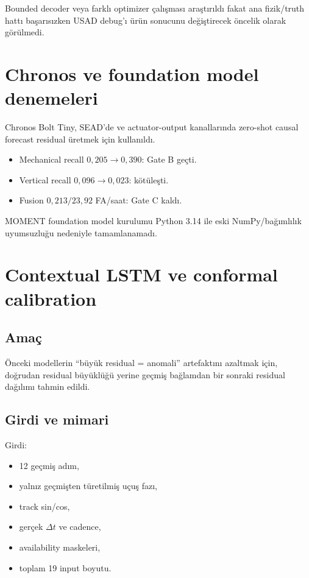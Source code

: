 \documentclass[11pt,a4paper,oneside]{report}
\newcommand{\code}[1]{\texttt{\detokenize{#1}}}
\begin{document}
Bounded decoder veya farklı optimizer çalışması araştırıldı fakat ana
fizik/truth hattı başarısızken USAD debug'ı ürün sonucunu değiştirecek öncelik
olarak görülmedi.

\section{Chronos ve foundation model denemeleri}

Chronos Bolt Tiny, SEAD'de \code{alt} ve actuator-output kanallarında
zero-shot causal forecast residual üretmek için kullanıldı.

\begin{itemize}
  \item Mechanical recall \(0{,}205\to0{,}390\): Gate B geçti.
  \item Vertical recall \(0{,}096\to0{,}023\): kötüleşti.
  \item Fusion \(0{,}213/23{,}92\) FA/saat: Gate C kaldı.
\end{itemize}

MOMENT foundation model kurulumu Python 3.14 ile eski NumPy/bağımlılık
uyumsuzluğu nedeniyle tamamlanamadı.

\section{Contextual LSTM ve conformal calibration}

\subsection{Amaç}

Önceki modellerin ``büyük residual = anomali'' artefaktını azaltmak için,
doğrudan residual büyüklüğü yerine geçmiş bağlamdan bir sonraki residual
dağılımı tahmin edildi.

\subsection{Girdi ve mimari}

Girdi:

\begin{itemize}
  \item 12 geçmiş adım,
  \item yalnız geçmişten türetilmiş uçuş fazı,
  \item track sin/cos,
  \item gerçek \(\Delta t\) ve cadence,
  \item availability maskeleri,
  \item toplam 19 input boyutu.
\end{itemize}
\end{document}
